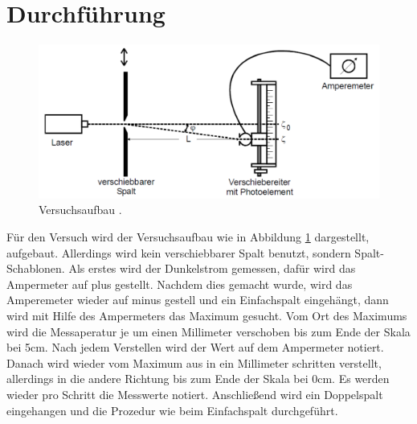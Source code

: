 \section{Durchführung}
\label{sec:Durchführung}
\begin{figure}[H]
    \centering
    \includegraphics{Versuchsaufbau.png}
    \caption{Versuchsaufbau \cite{V406}.}
    \label{fig:d}
\end{figure}
Für den Versuch wird der Versuchsaufbau wie in Abbildung \ref{fig:d} dargestellt, aufgebaut. 
Allerdings wird kein verschiebbarer Spalt benutzt, sondern Spalt-Schablonen.
Als erstes wird der Dunkelstrom gemessen, dafür wird das Ampermeter auf plus gestellt. 
Nachdem dies gemacht wurde, wird das Amperemeter wieder auf minus gestell und ein Einfachspalt eingehängt, dann wird mit Hilfe des Ampermeters das Maximum gesucht. 
Vom Ort des Maximums wird die Messaperatur je um einen Millimeter verschoben bis zum Ende der Skala bei 5cm. 
Nach jedem Verstellen wird der Wert auf dem Ampermeter notiert. Danach wird wieder vom Maximum aus in ein Millimeter schritten 
verstellt, allerdings in die andere Richtung bis zum Ende der Skala bei 0cm. Es werden wieder pro Schritt die Messwerte notiert.
Anschließend wird ein Doppelspalt eingehangen und die Prozedur wie beim Einfachspalt durchgeführt.
